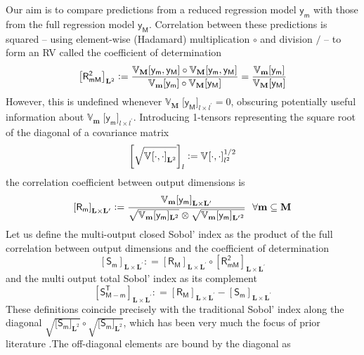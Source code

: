 \documentclass[preprint,12pt]{elsarticle}
\newcommand*{\M}[1]{\ensuremath{#1}\xspace}
\newcommand*{\x}{\times}
\newcommand*{\mi}[1]{\mathbf{#1}}
\newcommand*{\rv}[1]{\mathsf{#1}}
\newcommand*{\te}[2][]{\left\lbrack{#2}\right\rbrack_{#1}}
\newcommand*{\tte}[2][]{\lbrack{#2}\rbrack_{#1}}
\newcommand*{\deq}{\M{\mathrel{\mathop:}=}}
\newcommand*{\cov}[3][]{\ifthenelse{\equal{#1}{}}{\mathbb{V}_{#3}\!\left\lbrack{#2}\right\rbrack}{\mathbb{V}_{#3}\!\left\lbrack{#2,#1}\right\rbrack}}
\newcommand*{\covt}[2]{\mathbb{V}_{#2}\!{#1}}
\begin{document}
    Our aim is to compare predictions from a reduced regression model $\rv{y_m}$ with those from the full regression model $\rv{y_M}$. Correlation between these predictions is squared -- using element-wise (Hadamard) multiplication $\circ$ and division $/$ -- to form an RV called the coefficient of determination
    \begin{equation}
        \te[\mi{L}^2]{\rv{R_{mM}^{2}}} \deq 
        \frac{\cov[\rv{y_M}]{\rv{y_m}}{\mi{M}} \circ \cov[\rv{y_M}]{\rv{y_m}}{\mi{M}}}
        {\cov{\rv{y_m}}{\mi{m}} \circ \cov{\rv{y_M}}{\mi{M}}} =
        \frac{\cov{\rv{y_m}}{\mi{m}}}{\cov{\rv{y_M}}{\mi{M}}}
    \end{equation}
    However, this is undefined whenever $\covt{\;\tte[l\x l^{\prime}]{\rv{y_M}}}{\mi{M}} = 0$, obscuring potentially useful information about $\covt{\;\tte[l\x l^{\prime}]{\rv{y_m}}}{\mi{m}}$. Introducing 1-tensors representing the square root of the diagonal of a covariance matrix
    \begin{equation}
        \te[l]{\sqrt{\cov[\cdot]{\cdot}{}_{\mi{L}^{2}}}} \deq \cov[\cdot]{\cdot}{}_{l^2}^{1/2}
    \end{equation}
    the correlation coefficient between output dimensions is
    \begin{equation}
        \te[\mi{L\x L^{\prime}}]{\rv{R_{m}}} \deq \frac{\cov{\rv{y_m}}{\mi{m}}_{\mi{L\x L^{\prime}}}} {\sqrt{\covt{\,\tte[\mi{L}^2]{\rv{y_m}}}{\mi{m}}}\otimes\sqrt{\covt{\,\tte[\mi{L^{\prime}}^2]{\rv{y_m}}}{\mi{m}}}}
        \ \ \forall \mi{m}\subseteq \mi{M}
    \end{equation}
    Let us define the multi-output closed Sobol' index as the product of the full correlation between output dimensions and the coefficient of determination
    \begin{equation}
            \te[\mi{L\x L^{\prime}}]{\rv{S_m}} \deq \te[\mi{L\x L^{\prime}}]{\rv{R_{M}}} \circ \te[\mi{L\x L^{\prime}}]{\rv{R_{mM}^{2}}} 
    \end{equation}
    and the multi output total Sobol' index as its complement
    \begin{equation*}
        \te[\mi{L\x L^{\prime}}]{\rv{S^{T}_{M-m}}} \deq \te[\mi{L\x L^{\prime}}]{\rv{R_M}} - \te[\mi{L\x L^{\prime}}]{\rv{S_m}}
    \end{equation*}
    These definitions coincide precisely with the traditional Sobol' index along the diagonal $\sqrt{\tte[\mi{L}^{2}]{\rv{S_m}}} \circ \sqrt{\tte[\mi{L}^{2}]{\rv{S_m}}}$, which has been very much the focus of prior literature \cite{Gamboa.etal2013,Xiao2017,GarciaCabrejo2014}.The off-diagonal elements are bound by the diagonal as
\end{document}
